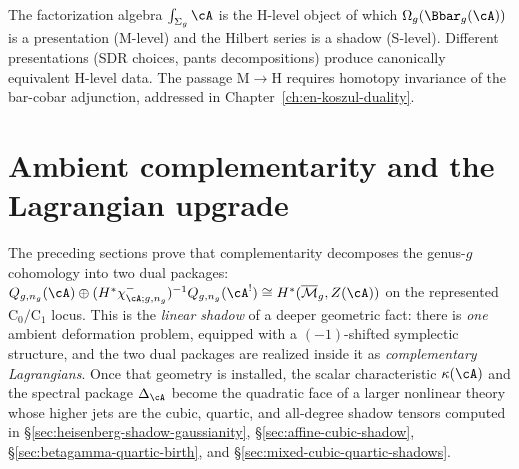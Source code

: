 \begin{remark}
\label{rem:factorization-natural}
The factorization algebra $\int_{\Sigma_g}\cA$ is the H-level object
of which $\Omega_g(\Bbar_g(\cA))$ is a presentation (M-level) and
the Hilbert series is a shadow (S-level).
Different presentations (SDR choices, pants decompositions) produce
canonically equivalent H-level data.
The passage M$\to$H requires homotopy invariance of the bar-cobar
adjunction, addressed in Chapter~\ref{ch:en-koszul-duality}.
\end{remark}




\section{Ambient complementarity and the Lagrangian upgrade}
\label{sec:ambient-complementarity-lagrangian}

The preceding sections prove that complementarity decomposes the
genus-$g$ cohomology into two dual packages:
$Q_{g,n_g}(\cA)\oplus
(H^*\chi^-_{\cA;g,n_g})^{-1}Q_{g,n_g}(\cA^!)
\cong H^*(\overline{\mathcal{M}}_g,Z(\cA))$ on the represented
\(\mathrm C_0/\mathrm C_1\) locus.  This is the \emph{linear shadow}
of a deeper geometric fact: there is \emph{one} ambient deformation problem,
equipped with a $(-1)$-shifted symplectic structure, and the two dual
packages are realized inside it as \emph{complementary Lagrangians}.
Once that geometry is installed, the scalar characteristic
$\kappa(\cA)$ and the spectral package $\Delta_{\cA}$ become the
quadratic face of a larger nonlinear theory whose higher jets are the
cubic, quartic, and all-degree shadow tensors computed in
\S\ref{sec:heisenberg-shadow-gaussianity},
\S\ref{sec:affine-cubic-shadow},
\S\ref{sec:betagamma-quartic-birth}, and
\S\ref{sec:mixed-cubic-quartic-shadows}.

